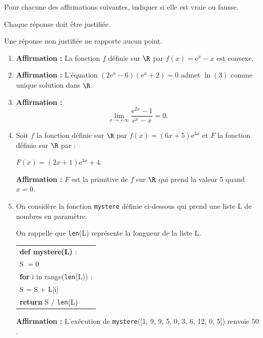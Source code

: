\medskip

Pour chacune des affirmations suivantes, indiquer si elle est vraie ou fausse. 

Chaque réponse doit être justifiée. 

Une réponse non justifiée ne rapporte aucun point.

\medskip

\begin{enumerate}
\item \textbf{Affirmation :} La fonction $f$ définie sur $\R$ par $f(x) = \text{e}^x - x$ est convexe.
\item \textbf{Affirmation :} L'équation $\left(2\text{e}^x - 6\right)\left(\text{e}^x + 2\right) = 0$ admet $\ln (3)$ comme unique solution dans $\R$.
\item \textbf{Affirmation :}
\[\displaystyle\lim_{x \to + \infty} \dfrac{\text{e}^{2x} - 1}{\text{e}^x - x} = 0.\]

\item Soit $f$ la fonction définie sur $\R$ par $f(x) = (6x + 5)\text{e}^{3x}$ et $F$ la fonction définie sur $\R$ par : 

$F(x) = (2x + 1)\text{e}^{3x} + 4$.

\textbf{Affirmation :} $F$ est la primitive de $f$ sur $\R$ qui prend la valeur 5 quand $x = 0$.
\item On considère la fonction \texttt{mystere} définie ci-dessous qui prend une liste L de nombres en paramètre.

On rappelle que \texttt{len}(L) représente la longueur de la liste L.

\begin{center}
\begin{tabular}{|l|}\hline
\textbf{def mystere(L)} :\\
	\quad  S $= 0$\\
	\quad \textbf{for} i in range(\texttt{len}(L)) :\\
	\quad \qquad S = S + L[i]\\
	\quad \textbf{return} S / \texttt{len}(L)\\ \hline
	\end{tabular}
\end{center}

\textbf{Affirmation :} L'exécution de \texttt{mystere}([1, 9, 9, 5, 0, 3, 6,  12, 0, 5]) renvoie $50$.
\end{enumerate}

\bigskip
